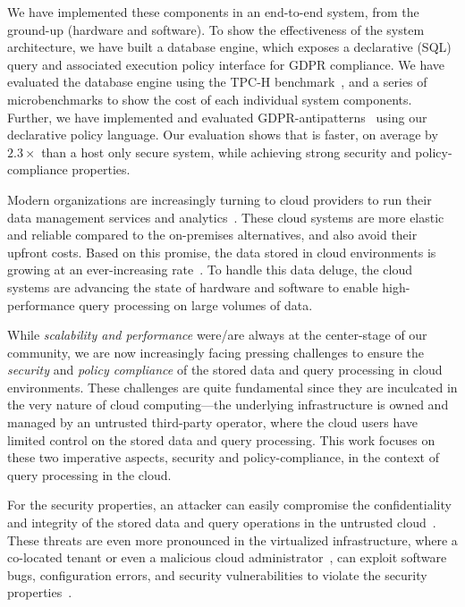 We have implemented these components in an end-to-end system, from the ground-up (hardware and software). To show the effectiveness of the \project system architecture, we have built a \csd database engine, which exposes a declarative (SQL) query and associated execution policy interface for GDPR compliance. We have evaluated the \project database engine using the TPC-H  benchmark~\cite{tpch-benchmark}, and a series of microbenchmarks to show the cost of each individual system components. Further, we have implemented and evaluated GDPR-antipatterns~\cite{shastrihotcloud2019} using our declarative policy language. Our evaluation shows that \project is faster, on average by $2.3\times$ than a host only secure system, while achieving strong security  and policy-compliance properties. 




 Modern organizations are increasingly turning to cloud providers to run their data management services and analytics~\cite{azure-cloud, google-cloud, cloud-computing-papers}. These cloud systems are more elastic and reliable compared to the on-premises alternatives, and also avoid their upfront costs. Based on this promise, the data stored in cloud environments is growing at an ever-increasing rate~\cite{bhatotia2012}. To handle this data deluge, the cloud systems are advancing the state of hardware and software to enable high-performance query processing on large volumes of data. 


While {\em scalability and performance} were/are always at the center-stage of our community, we are now increasingly facing pressing challenges to ensure the {\em security} and {\em policy compliance} of the stored data and query processing in cloud environments. These challenges are quite fundamental since they are inculcated in the very nature of cloud computing---the underlying infrastructure is owned and managed by an untrusted third-party operator, where the cloud users have limited control on the stored data and query processing. This work focuses on these two imperative aspects, security and  policy-compliance, in the context of query processing in the cloud.


For the security properties, an attacker can easily compromise the confidentiality and integrity of the stored data and query operations in the untrusted cloud~\cite{santos-hotcloud-2009}. These threats are even more pronounced in the virtualized infrastructure, where a co-located tenant or even a malicious cloud administrator~\cite{santos-security-2012, nuno-bford-middleware-2012},  can exploit software bugs, configuration errors, and security vulnerabilities to violate the security properties~\cite{gunawi2014, shinde-panoply,hahnel-atc-2017}.



